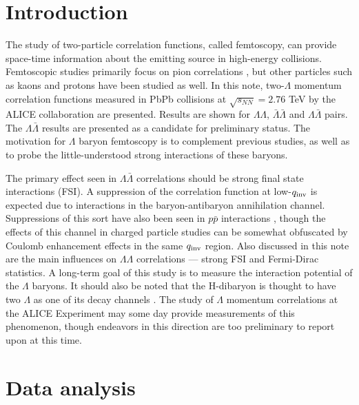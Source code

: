 %
\tableofcontents
\listoffigures
\pagebreak
\section{Introduction}



The study of two-particle correlation functions, called femtoscopy, can provide space-time information about the emitting source in high-energy collisions.  Femtoscopic studies primarily focus on pion correlations \cite{Aamodt:2011mr}, but other particles such as kaons \cite{Abelev:2012ms} and protons \cite{Gos:2007cj} have been studied as well. In this note, two-$\Lambda$ momentum correlation functions measured in PbPb collisions at $\sqrt{s_{NN}}=2.76$ TeV by the ALICE collaboration are presented.  Results are shown for $\Lambda\Lambda$, $\bar{\Lambda}\bar{\Lambda}$ and $\Lambda\bar{\Lambda}$ pairs. The $\Lambda\bar{\Lambda}$ results are presented as a candidate for preliminary status. The motivation for $\Lambda$ baryon femtoscopy is to complement previous studies, as well as to probe the little-understood strong interactions of these baryons.


The primary effect seen in $\Lambda\bar{\Lambda}$ correlations should be strong final state interactions (FSI).  A suppression of the correlation function at low-$q_{\rm inv}$ is expected due to interactions in the baryon-antibaryon annihilation channel.  Suppressions of this sort have also been seen in $p \bar{p}$ interactions \cite{Gos:2007cj}, though the effects of this channel in charged particle studies can be somewhat obfuscated by Coulomb enhancement effects in the same $q_{\rm inv}$ region.  Also discussed in this note are the main influences on $\Lambda\Lambda$ correlations --- strong FSI and Fermi-Dirac statistics.  A long-term goal of this study is to measure the interaction potential of the $\Lambda$ baryons. It should also be noted that the H-dibaryon is thought to have two $\Lambda$ as one of its decay channels \cite{PhysRevLett.38.195}.  The study of $\Lambda$ momentum correlations at the ALICE Experiment may some day provide measurements of this phenomenon, though endeavors in this direction are too preliminary to report upon at this time.

\section{Data analysis}

